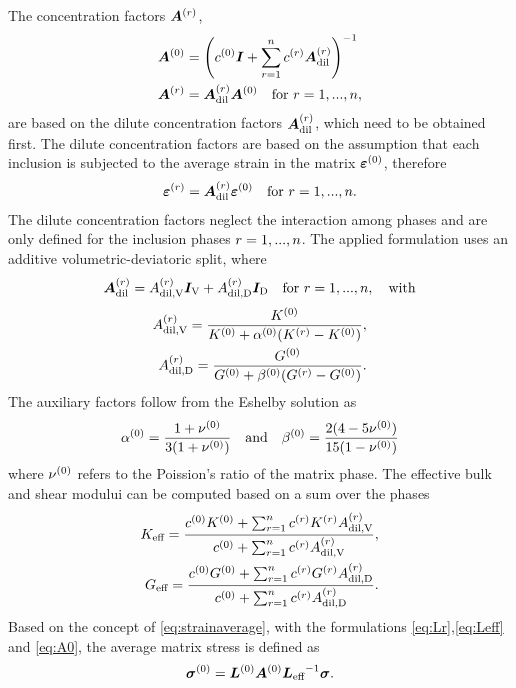 The concentration factors $\boldsymbol{A}^{(r)}$,
\begin{align}
	\boldsymbol{A}^{(0)} &= \left( c^{(0)}\boldsymbol{I} + \sum^{n}_{r=1} c^{(r)} \boldsymbol{A}_{\text{dil}}^{(r)}\right)^{-1}\label{eq:A0}\\
	\boldsymbol{A}^{(r)} &= \boldsymbol{A}_{\text{dil}}^{(r)}\boldsymbol{A}^{(0)}\quad  \text{for}~ r = 1, ..., n,
\end{align}
are based on the dilute concentration factors $\boldsymbol{A}_{\text{dil}}^{(r)}$, which need to be obtained first.
The dilute concentration factors are based on the assumption that each inclusion is subjected to the average strain in the matrix $\boldsymbol{\varepsilon}^{(0)}$, therefore
\begin{align}
	\boldsymbol{\varepsilon}^{(r)} = \boldsymbol{A}_{\text{dil}}^{(r)}\boldsymbol{\varepsilon}^{(0)} \quad  \text{for}~ r = 1, ..., n. 
\end{align}
The dilute concentration factors neglect the interaction among phases and are only defined for the inclusion phases $r = 1,...,n$.
The applied formulation uses an additive volumetric-deviatoric split, where
\begin{align}
	\boldsymbol{A}_{\text{dil}}^{(r)} = A^{(r)}_{\text{dil,V}}\boldsymbol{I}_{\text{V}} +  A^{(r)}_{\text{dil,D}} \boldsymbol{I}_{\text{D}} \quad  \text{for}~ r = 1, ..., n, \text{\quad with}
\end{align}
\begin{align}
	A^{(r)}_{\text{dil,V}} = \dfrac{K^{(0)}}{K^{(0)} + \alpha^{(0)}(K^{(r)} - K^{(0)})}, \\
	A^{(r)}_{\text{dil,D}} = \dfrac{G^{(0)}}{G^{(0)} + \beta^{(0)}(G^{(r)} - G^{(0)})}.
\end{align}
The auxiliary factors follow from the Eshelby solution as
\begin{align}
	\alpha^{(0)} = \frac{1 + \nu^{(0)}}{3(1+ \nu^{(0)})} \quad\text{and}\quad 
	\beta^{(0)} = \frac{2(4 - 5\nu^{(0)})}{15(1 - \nu^{(0)})}
\end{align}
where  $\nu^{(0)}$ refers to the Poission's ratio of the matrix phase.
The effective bulk and shear modului can be computed based on a sum over the phases
\begin{align}
K_{\text{eff}} = \dfrac{c^{(0)}K^{(0)} + \sum^{n}_{r=1} c^{(r)} K^{(r)} A^{(r)}_{\text{dil,V}}}{c^{(0)} + \sum^{n}_{r=1} c^{(r)} A^{(r)}_{\text{dil,V}}},\label{eq:keff} \\
G_{\text{eff}} = \dfrac{c^{(0)}G^{(0)} + \sum^{n}_{r=1} c^{(r)} G^{(r)} A^{(r)}_{\text{dil,D}}}{c^{(0)} + \sum^{n}_{r=1} c^{(r)} A^{(r)}_{\text{dil,D}}}.\label{eq:geff}
\end{align}
Based on the concept of \eqref{eq:strainaverage}, with the formulations \eqref{eq:Lr},\eqref{eq:Leff} and \eqref{eq:A0}, the average matrix stress is defined as 
\begin{align}
\boldsymbol{\sigma}^{(0)} = \boldsymbol{L}^{(0)}\boldsymbol{A}^{(0)} {\boldsymbol{L}_{\text{eff}}}^{-1}\boldsymbol{\sigma}. \label{eq:matrixstress}
\end{align}

